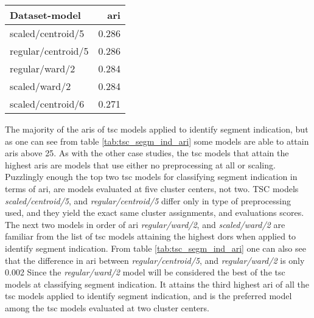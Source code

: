 \begin{table*}
    \centering
    \begin{tabular}{lr}
        \toprule
        Dataset-model     &  \acrshort{ari} \\
        \midrule
        scaled/centroid/5  & 0.286 \\
        regular/centroid/5 & 0.286 \\
        regular/ward/2     & 0.284 \\
        scaled/ward/2      & 0.284 \\
        scaled/centroid/6  & 0.271 \\
        \bottomrule
    \end{tabular}
    \caption{The five highest \acrshort{ari} scores attained when applying \acrshort{tsc} for detecting segmend indication.
             The \textbf{Dataset-model} column indicates \textit{Type of preprocessing used}$/$\textit{Linkage criteria of model}$/$\textit{Number of cluster centers}.}
    \label{tab:tsc_segm_ind_ari}
\end{table*}

The majority of the \acrshort{ari}s of \acrshort{tsc} models applied to identify segment indication, but as one can see from table \ref{tab:tsc_segm_ind_ari} some models are able to attain \acrshort{ari}s above 25.
As with the other case studies, the \acrshort{tsc} models that attain the highest \acrshort{ari}s are models that use either no preprocessing at all or scaling. 
Puzzlingly enough the top two \acrshort{tsc} models for classifying segment indication in terms of \acrshort{ari}, are models evaluated at five cluster centers, not two. 
TSC models \textit{scaled/centroid/5}, and \textit{regular/centroid/5} differ only in type of preprocessing used, and they yield the exact same cluster assignments, and evaluations scores.
The next two models in order of \acrshort{ari} \textit{regular/ward/2}, and \textit{scaled/ward/2} are familiar from the list of \acrshort{tsc} models attaining the highest \acrshort{dor}s when applied to identify segment indication.
From table \ref{tab:tsc_segm_ind_ari} one can also see that the difference in \acrshort{ari} between \textit{regular/centroid/5}, and \textit{regular/ward/2} is only 0.002
Since the \textit{regular/ward/2} model will be considered the best of the \acrshort{tsc} models at classifying segment indication.
It attains the third highest \acrshort{ari} of all the \acrshort{tsc} models applied to identify segment indication, and is the preferred model among the \acrshort{tsc} models evaluated at two cluster centers.

